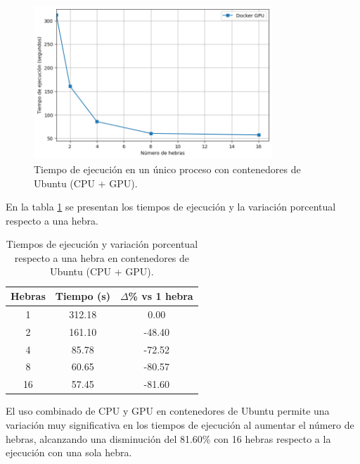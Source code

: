\begin{figure}[H]
    \centering
    \includegraphics[width=0.8\textwidth]{imagenes/cap5/single-node_ubuntu_docker_gpu_time.png}
    \caption{Tiempo de ejecución en un único proceso con contenedores de Ubuntu (CPU + GPU).}
    \label{fig:single-node_ubuntu_docker_gpu_time}
\end{figure}

En la tabla \ref{tab:single-node_ubuntu_docker_gpu} se presentan los tiempos de ejecución y la variación porcentual respecto a una hebra.

\begin{table}[ht]
    \centering
    \begin{tabular}{|c|c|c|}
        \hline
        \textbf{Hebras} & \textbf{Tiempo (s)} & \textbf{$\Delta$\% vs 1 hebra} \\
        \hline
        1               & 312.18              & 0.00                           \\
        2               & 161.10              & -48.40                         \\
        4               & 85.78               & -72.52                         \\
        8               & 60.65               & -80.57                         \\
        16              & 57.45               & -81.60                         \\
        \hline
    \end{tabular}
    \caption{Tiempos de ejecución y variación porcentual respecto a una hebra en contenedores de Ubuntu (CPU + GPU).}
    \label{tab:single-node_ubuntu_docker_gpu}
\end{table}

El uso combinado de CPU y GPU en contenedores de Ubuntu permite una variación muy significativa en los tiempos de ejecución al aumentar el número de hebras, alcanzando una disminución del 81.60\% con 16 hebras respecto a la ejecución con una sola hebra.

